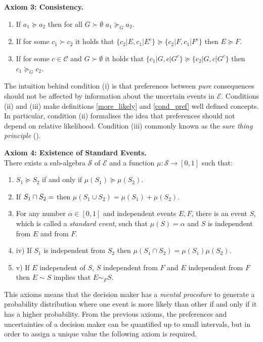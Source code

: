 \documentclass[english,letterpaper,12pt,final]{article}
\theoremstyle{definition}
\begin{document}
	\textbf{Axiom 3: Consistency.}
	\begin{enumerate}[label=(\roman*)]
	\item If $a_1 \succeq a_2$ then for all $G \succ \emptyset$ $a_1 \succeq_G a_2$.
	\item If for some $c_1 \succ c_2$ it holds that $\{ c_2 | E, c_1 | E^c \} \succeq \{ c_2 | F, c_1 | F^c \}$ then $E \succeq F$.
	\item If for some $c \in \mathcal{C}$ and $G \succ \emptyset$ it holds that $\{ c_1 | G, c | G^c \} \succeq \{c_2 | G, c | G^c  \}$ then $c_1 \succeq_G c_2$.
 	\end{enumerate}
    The intuition behind condition (i) is that preferences between \textit{pure} consequences should not be affected by information about the uncertain events in $\mathcal{E}$. Conditions (ii) and (iii) make definitions \ref{more_likely} and \ref{cond_pref} well defined concepts. In particular, condition (ii) formalises the idea that preferences should not depend on relative likelihood. Condition (iii) commonly known as the \textit{sure thing principle} (\cite{bernardo2000bayesian}).
	
	\textbf{Axiom 4: Existence of Standard Events.}\\
	There exists a sub-algebra $\mathcal{S}$ of $\mathcal{E}$ and a function $\mu : \mathcal{S} \to [0,1]$ such that:
	\begin{enumerate}[label=(\roman*)]
	\item $S_1 \succeq S_2$ if and only if $\mu(S_1) \succeq \mu(S_2)$.
	\item If $S_1 \cap S_2 = \empty$ then $\mu(S_1 \cup S_2) = \mu(S_1) + \mu(S_2)$.
	\item For any number $\alpha \in [0,1]$ and independent events $E,F$, there is an event $S$, which is called a \textit{standard event}, such that $\mu(S)=\alpha$ and $S$ is independent from $E$ and from $F$.
	\item iv) If $S_1$ is independent from $S_2$ then $\mu(S_1 \cap S_2)=\mu(S_1)\mu(S_2)$.
	\item v) If $E$ independent of $S$, $S$ independent from $F$ and $E$ independent from $F$ then $E \sim S$ implies that $E \sim_F S$.
	\end{enumerate}
	This axioms means that the decision maker has a \textit{mental procedure} to generate a probability distribution where one event is more likely than other if and only if it has a higher probability. From the previous axioms, the preferences and uncertainties of a decision maker can be quantified up to small intervals, but in order to assign a unique value the following axiom is required.
	
\end{document}
